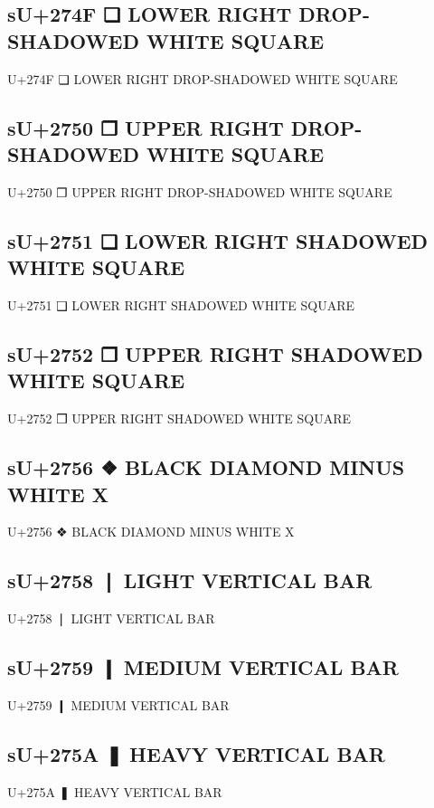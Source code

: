 \subsection{sU+274F ❏ LOWER RIGHT DROP-SHADOWED WHITE SQUARE}

U+274F ❏ LOWER RIGHT DROP-SHADOWED WHITE SQUARE

\subsection{sU+2750 ❐ UPPER RIGHT DROP-SHADOWED WHITE SQUARE}

U+2750 ❐ UPPER RIGHT DROP-SHADOWED WHITE SQUARE

\subsection{sU+2751 ❑ LOWER RIGHT SHADOWED WHITE SQUARE}

U+2751 ❑ LOWER RIGHT SHADOWED WHITE SQUARE

\subsection{sU+2752 ❒ UPPER RIGHT SHADOWED WHITE SQUARE}

U+2752 ❒ UPPER RIGHT SHADOWED WHITE SQUARE

\subsection{sU+2756 ❖ BLACK DIAMOND MINUS WHITE X}

U+2756 ❖ BLACK DIAMOND MINUS WHITE X

\subsection{sU+2758 ❘ LIGHT VERTICAL BAR}

U+2758 ❘ LIGHT VERTICAL BAR

\subsection{sU+2759 ❙ MEDIUM VERTICAL BAR}

U+2759 ❙ MEDIUM VERTICAL BAR

\subsection{sU+275A ❚ HEAVY VERTICAL BAR}

U+275A ❚ HEAVY VERTICAL BAR

